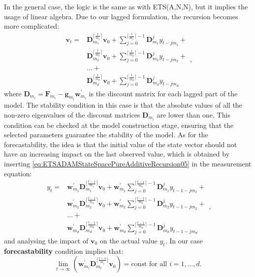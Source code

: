\documentclass[]{book}
\theoremstyle{definition}
\theoremstyle{definition}
\theoremstyle{definition}
\theoremstyle{definition}
\theoremstyle{remark}
\begin{document}
In the general case, the logic is the same as with ETS(A,N,N), but it implies the usage of linear algebra. Due to our lagged formulation, the recursion becomes more complicated:
\begin{equation}
  \begin{aligned}
    \mathbf{v}_{t} = & \mathbf{D}_{m_1}^{\lceil\frac{t}{m_1}\rceil} \mathbf{v}_{0} + \sum_{j=0}^{\lceil\frac{t}{m_1}\rceil-1} \mathbf{D}_{m_1}^{j} y_{t -j m_1} + \\
    & \mathbf{D}_{m_2}^{\lceil\frac{t}{m_2}\rceil} \mathbf{v}_{0} + \sum_{j=0}^{\lceil\frac{t}{m_2}\rceil-1} \mathbf{D}_{m_2}^j y_{t -j m_2} + \\
    & \dots + \\
    & \mathbf{D}_{m_d}^{\lceil\frac{t}{m_d}\rceil} \mathbf{v}_{0} + \sum_{j=0}^{\lceil\frac{t}{m_d}\rceil-1} \mathbf{D}_{m_d}^j y_{t -j m_d}
  \end{aligned},
  \label{eq:ETSADAMStateSpacePureAdditiveRecursion05}
\end{equation}
where \(\mathbf{D}_{m_i} = \mathbf{F}_{m_i} -\mathbf{g}_{m_i} \mathbf{w}_{m_i}^\prime\) is the discount matrix for each lagged part of the model. The stability condition in this case is that the absolute values of all the non-zero eigenvalues of the discount matrices \(\mathbf{D}_{m_i}\) are lower than one. This condition can be checked at the model construction stage, ensuring that the selected parameters guarantee the stability of the model. As for the forecastability, the idea is that the initial value of the state vector should not have an increasing impact on the last observed value, which is obtained by inserting \eqref{eq:ETSADAMStateSpacePureAdditiveRecursion05} in the measurement equation:
\begin{equation}
  \begin{aligned}
  y_t = & \mathbf{w}_{m_1}^\prime \mathbf{D}_{m_1}^{\lceil\frac{t-1}{m_1}\rceil} \mathbf{v}_{0} + \mathbf{w}_{m_1}^\prime \sum_{j=0}^{\lceil\frac{t-1}{m_1}\rceil-1} \mathbf{D}_{m_1}^{j} y_{t-1 -j m_1} + \\
        & \mathbf{w}_{m_2}^\prime \mathbf{D}_{m_2}^{\lceil\frac{t-1}{m_2}\rceil} \mathbf{v}_{0} + \mathbf{w}_{m_2}^\prime \sum_{j=0}^{\lceil\frac{t-1}{m_2}\rceil-1} \mathbf{D}_{m_2}^j y_{t-1 -j m_2} + \\
        & \dots + \\
        & \mathbf{w}_{m_d}^\prime \mathbf{D}_{m_d}^{\lceil\frac{t-1}{m_d}\rceil} \mathbf{v}_{0} + \mathbf{w}_{m_d}^\prime \sum_{j=0}^{\lceil\frac{t-1}{m_d}\rceil-1} \mathbf{D}_{m_d}^j y_{t-1 -j m_d}
  \end{aligned},
  \label{eq:ETSADAMStateSpacePureAdditiveRecursionForecastability}
\end{equation}
and analysing the impact of \(\mathbf{v}_0\) on the actual value \(y_t\). In our case \textbf{forecastability} condition implies that:
\begin{equation}
  \lim\limits_{t\rightarrow\infty}\left(\mathbf{w}_{m_i}^\prime\mathbf{D}_{m_i}^{\lceil\frac{t-1}{m_i}\rceil} \mathbf{v}_{0}\right) = \text{const for all } i=1, \dots, d.
  \label{eq:ETSADAMStateSpacePureAdditiveRecursionForecastabilityFinal}
\end{equation}
\end{document}
